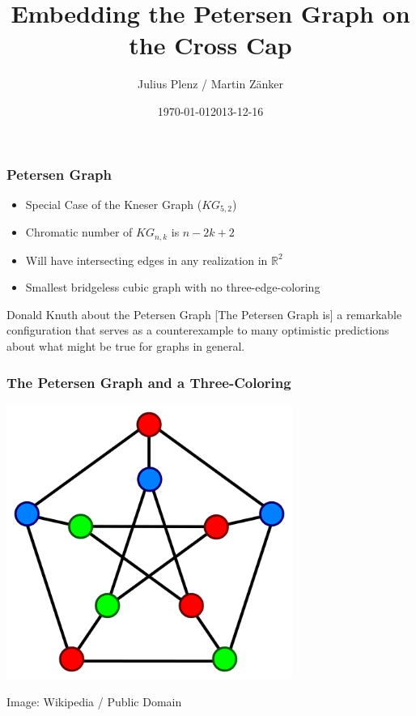 \documentclass{beamer}
\date{\today}
\begin{document}
\newlength{\wideitemsep}
\setlength{\wideitemsep}{\itemsep}
\addtolength{\wideitemsep}{2pt}
\let\olditem\item
\renewcommand{\item}{
    \setlength{\itemsep}{\wideitemsep}
    \olditem
}

\begin{frame}
    \title{Embedding the Petersen Graph on the Cross Cap}
    \author{Julius Plenz / Martin Zänker}
    \date{2013-12-16}
    \titlepage
\end{frame}

\begin{frame}
 \frametitle{Petersen Graph}
  


\begin{itemize}
  \item Special Case of the Kneser Graph ($KG_{5,2}$)
  \item Chromatic number of $KG_{n,k}$ is $n - 2k + 2$
  \item Will have intersecting edges in any realization in $\mathbb{R}^2$
  \item Smallest bridgeless cubic graph with no three-edge-coloring
\end{itemize}

\begin{block}{Donald Knuth about the Petersen Graph}
[The Petersen Graph is] a remarkable configuration that serves as a
counterexample to many optimistic predictions about what might be true for
graphs in general.
\end{block}

  
 \end{frame}
\begin{frame}
 \frametitle{The Petersen Graph and a Three-Coloring}
  


\begin{center}
\includegraphics[width=0.7\textwidth]{petersen-graph.png}
\end{center}

\hfill\footnotesize{Image: Wikipedia / Public Domain}

  
 \end{frame}
\end{document}
